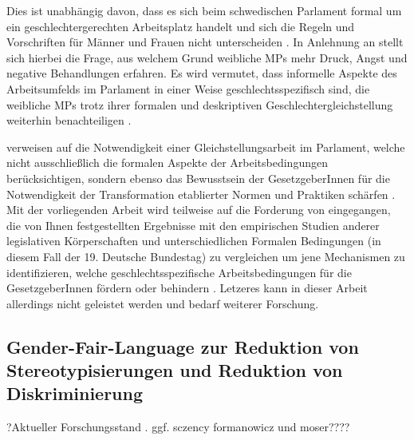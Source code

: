 \documentclass[12pt, 
    twoside=false, 
    bibliography=totoc, 
    numbers=endperiod, 
    headings=normal, 
    toc=chapterentrydotfill
    ]{scrbook}
\begin{document}
 Dies ist unabhängig davon, dass es sich beim schwedischen Parlament formal um ein geschlechtergerechten Arbeitsplatz handelt und sich die Regeln und Vorschriften für Männer und Frauen nicht unterscheiden \parencite[211]{erikson_2018}. In Anlehnung an \textcite{erikson_2018} stellt sich hierbei die Frage, aus welchem Grund weibliche MPs mehr Druck, Angst und negative Behandlungen erfahren. Es wird vermutet, dass informelle Aspekte des Arbeitsumfelds im Parlament in einer Weise geschlechtsspezifisch sind, die weibliche MPs trotz ihrer formalen und deskriptiven Geschlechtergleichstellung weiterhin benachteiligen \parencite[210]{erikson_2018}.

\textcite{erikson_2018} verweisen auf die Notwendigkeit einer Gleichstellungsarbeit im Parlament, welche nicht ausschließlich die formalen Aspekte der Arbeitsbedingungen berücksichtigen, sondern ebenso das Bewusstsein der GesetzgeberInnen für die Notwendigkeit der Transformation etablierter Normen und Praktiken schärfen \parencite[211]{erikson_2018}.
Mit der vorliegenden Arbeit wird teilweise auf die Forderung von\textcite{erikson_2018} eingegangen, die von Ihnen festgestellten Ergebnisse mit den empirischen Studien anderer legislativen Körperschaften und unterschiedlichen Formalen Bedingungen (in diesem Fall der 19. Deutsche Bundestag) zu vergleichen um jene Mechanismen zu identifizieren, welche geschlechtsspezifische Arbeitsbedingungen für die GesetzgeberInnen fördern oder behindern \parencite[211]{erikson_2018}. Letzeres kann in dieser Arbeit allerdings nicht geleistet werden und bedarf weiterer Forschung. 


\subsection{Gender-Fair-Language zur Reduktion von Stereotypisierungen und Reduktion von Diskriminierung}

?Aktueller Forschungsstand . ggf. sczency formanowicz und moser???? 
\end{document}
